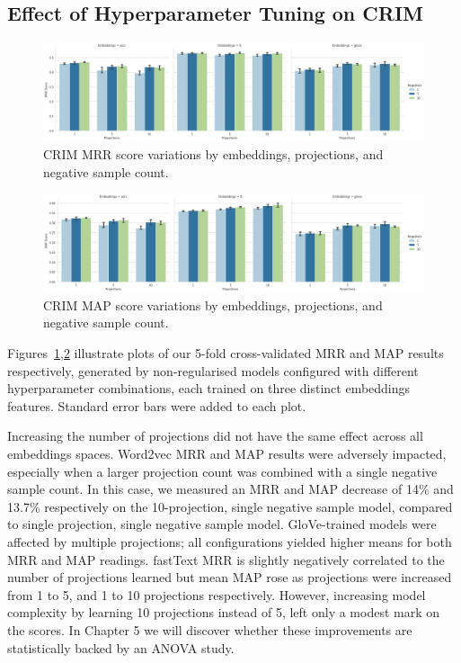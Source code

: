 \subsection{Effect of Hyperparameter Tuning on CRIM} \label{hyper_effect_CRIM}
\begin{figure}[ht!] 
  \centering
  \includegraphics[width=1.\linewidth]{images/CRIM_MRR_score_projection_and_negative_sample.png}
  \caption{CRIM \ac{MRR} score variations by embeddings, projections, and negative sample count.}
  \label{fig:crim_hyper_mrr}
\end{figure}
\begin{figure}[ht!] 
  \centering
  \includegraphics[width=1.\linewidth]{images/CRIM_MAP_score_projection_and_negative_sample.png}
  \caption{CRIM \ac{MAP} score variations by embeddings, projections, and negative sample count.}
  \label{fig:crim_hyper_map}
\end{figure}
Figures~\ref{fig:crim_hyper_mrr},\ref{fig:crim_hyper_map} illustrate plots of our 5-fold cross-validated \ac{MRR} and \ac{MAP} results respectively, generated by non-regularised models configured with different hyperparameter combinations, each trained on three distinct embeddings features.  Standard error bars were added to each plot.  

Increasing the number of projections did not have the same effect across all embeddings spaces.  Word2vec \ac{MRR} and \ac{MAP} results were adversely impacted, especially when a larger projection count was combined with a single negative sample count.  In this case, we measured an MRR and MAP decrease of 14\% and 13.7\% respectively on the 10-projection, single negative sample model, compared to single projection, single negative sample model.  GloVe-trained models were affected by multiple projections; all configurations yielded higher means for both \ac{MRR} and \ac{MAP} readings.  fastText \ac{MRR} is slightly negatively correlated to the number of projections learned but mean \ac{MAP} rose as projections were increased from 1 to 5, and 1 to 10 projections respectively.  However, increasing model complexity by learning 10 projections instead of 5, left only a modest mark on the scores.  In Chapter 5 we will discover whether these improvements are statistically backed by an \ac{ANOVA} study.

